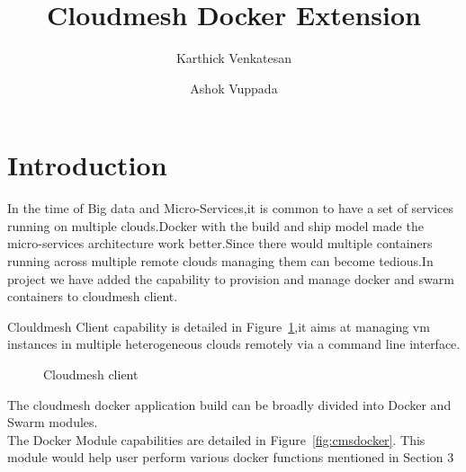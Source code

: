 \documentclass[9pt,twocolumn,twoside]{../../styles/osajnl}
\title{Cloudmesh Docker Extension}
\author[1]{Karthick Venkatesan}
\author[2]{Ashok Vuppada}
\affil[1]{School of Informatics and Computing, Bloomington, IN 47408, U.S.A.}
\begin{document}
\maketitle


\section{Introduction}
In the time of Big data and Micro-Services,it is common to have a set of services running on multiple clouds.Docker\cite{www-Docker} with the build and ship model made the micro-services architecture work better.Since there would multiple containers running across multiple remote clouds managing them can become tedious.In project we have added the capability to provision and manage docker\cite{www-Docker} and swarm\cite{www-Swarm} containers to cloudmesh client\cite{las14cloudmeshmultiple}.

Clouldmesh Client\cite{las14cloudmeshmultiple} capability is detailed in Figure~\ref{fig:cmvm},it aims at managing vm instances in multiple heterogeneous clouds remotely via a command line interface.

\begin{figure}[h!]
\centering
{}
\caption{Cloudmesh client }
\label{fig:cmvm}
\end{figure}

The cloudmesh docker application build  can be broadly divided into Docker and Swarm modules.\\

The Docker Module capabilities are detailed in
Figure~\ref{fig:cmsdocker}. This module would help user perform
various docker functions mentioned in Section 3 
\end{document}
